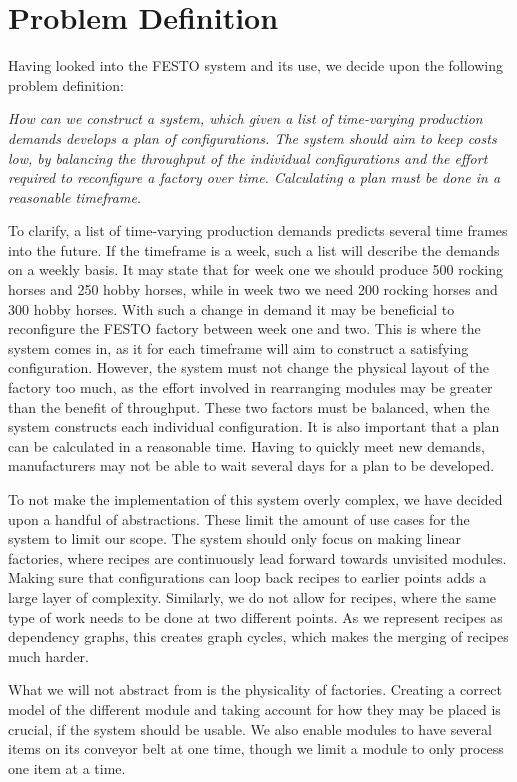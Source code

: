 \section{Problem Definition}\label{ch:problemdefinition}
Having looked into the FESTO system and its use, we decide upon the following problem definition:


\textit{How can we construct a system, which given a list of time-varying production demands  develops a plan of configurations. The system should aim to keep costs low, by balancing the throughput of the individual configurations and the effort required to reconfigure a factory over time. Calculating a plan must be done in a reasonable timeframe.}


To clarify, a list of time-varying production demands predicts several time frames into the future. If the timeframe is a week, such a list will describe the demands on a weekly basis. It may state that for week one we should produce 500 rocking horses and 250 hobby horses, while in week two we need 200 rocking horses and 300 hobby horses. With such a change in demand it may be beneficial to reconfigure the FESTO factory between week one and two. This is where the system comes in, as it for each timeframe will aim to construct a satisfying configuration. However, the system must not change the physical layout of the factory too much, as the effort involved in rearranging modules may be greater than the benefit of throughput. These two factors must be balanced, when the system constructs each individual configuration. It is also important  that a plan can be calculated in a reasonable time. Having to quickly meet new demands, manufacturers may not be able to wait several days for a plan to be developed.


To not make the implementation of this system overly complex, we have decided upon a handful of abstractions. These limit the amount of use cases for the system to limit our scope.  The system should only focus on making linear factories, where recipes are continuously lead forward towards  unvisited modules. Making sure that configurations can loop back recipes to earlier points adds a large layer of complexity. Similarly, we do not allow for recipes, where the same type of work needs to be done at two different points. As we represent recipes as dependency graphs, this creates graph cycles, which makes the merging of recipes much harder. 


What we will not abstract from is the physicality of factories. Creating a correct model of the different module and taking account for how they may be placed is crucial, if the system should be usable.  We also enable modules to have several items on its conveyor belt at one time, though we limit a module to only process one item at a time. 
